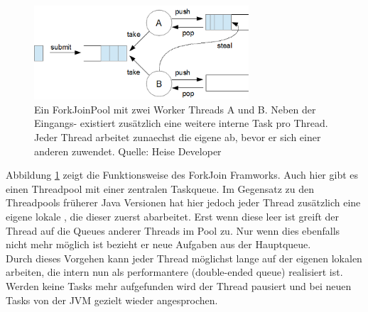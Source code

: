 \documentclass[times, 10pt,twocolumn]{article}
\begin{document}
\begin{figure}[h!]
\includegraphics[width=8cm]{../images/forkjoin.png}
\caption[Fork/Join Image.]{Ein ForkJoinPool mit zwei Worker Threads A und B. Neben der Eingangs- existiert zusätzlich eine weitere interne Task  pro Thread. Jeder Thread arbeitet zunaechst die eigene  ab, bevor er sich einer anderen zuwendet. Quelle: Heise Developer\cite{forkjoinheise}}
\label{forkjoinpic}
\end{figure}

Abbildung \ref{forkjoinpic} zeigt die Funktionsweise des ForkJoin Framworks. Auch hier gibt es einen Threadpool mit einer zentralen Taskqueue. Im Gegensatz zu den Threadpools früherer Java Versionen hat hier jedoch jeder Thread zusätzlich eine eigene lokale , die dieser zuerst abarbeitet. Erst wenn diese leer ist greift der Thread auf die Queues anderer Threads im Pool zu. Nur wenn dies ebenfalls nicht mehr möglich ist bezieht er neue Aufgaben aus der Hauptqueue.\\

Durch dieses Vorgehen kann jeder Thread möglichst lange auf der eigenen lokalen  arbeiten, die intern nun als performantere  (double-ended queue) realisiert ist. Werden keine Tasks mehr aufgefunden wird der Thread pausiert und bei neuen Tasks von der JVM gezielt wieder angesprochen.\cite{forkjoinheise}\\




\jDocIndex
\end{document}
